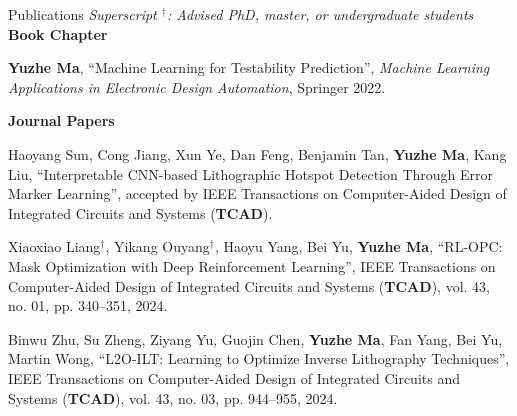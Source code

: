 \begin{rSection}{Publications}
\textit{Superscript $^\dagger$: Advised PhD, master, or undergraduate students}\\



\textbf{Book Chapter}
\begin{description}[font=\normalfont]
\item[{[B01]}] {
	\textbf{Yuzhe Ma},
	``Machine Learning for Testability Prediction'',
	\textit{Machine Learning Applications in Electronic Design Automation}, Springer 2022.
}
\end{description}

\textbf{Journal Papers}
\begin{etaremune}
	\renewcommand{\labelenumi}{[J\theenumi]}


\item {
	Haoyang Sun, Cong Jiang, Xun Ye, Dan Feng, Benjamin Tan, \textbf{Yuzhe Ma}, Kang Liu,
	``Interpretable CNN-based Lithographic Hotspot Detection Through Error Marker Learning'',
    accepted by IEEE Transactions on Computer-Aided Design of Integrated Circuits and Systems (\textbf{TCAD}).
}

\item {
	Xiaoxiao Liang$^\dagger$, Yikang Ouyang$^\dagger$, Haoyu Yang, Bei Yu, \textbf{Yuzhe Ma},
	``RL-OPC: Mask Optimization with Deep Reinforcement Learning'',
    IEEE Transactions on Computer-Aided Design of Integrated Circuits and Systems (\textbf{TCAD}), vol. 43, no. 01, pp. 340--351, 2024.
}

\item {
    Binwu Zhu, Su Zheng, Ziyang Yu, Guojin Chen, \textbf{Yuzhe Ma}, Fan Yang, Bei Yu, Martin Wong,
    ``L2O-ILT: Learning to Optimize Inverse Lithography Techniques'',
    IEEE Transactions on Computer-Aided Design of Integrated Circuits and Systems (\textbf{TCAD}), vol. 43, no. 03, pp. 944--955, 2024.
}


\end{etaremune}
\end{rSection}

